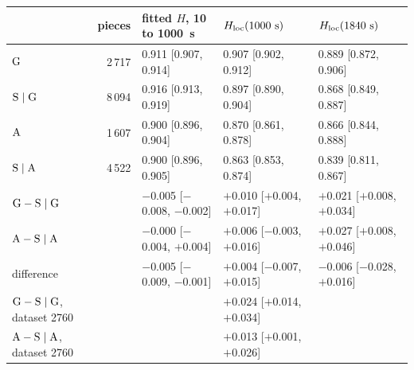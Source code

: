 \begin{tabular}{@{}l r l l l@{}}
\toprule
 & pieces & fitted $H$, 10 to 1000~s & $H_\mathrm{loc}(1000~\mathrm{s})$ & $H_\mathrm{loc}(1840~\mathrm{s})$ \\
\midrule
$\mathrm{G}$ & 2\,717 & 0.911 [0.907, 0.914] & 0.907 [0.902, 0.912] & 0.889 [0.872, 0.906] \\
$\mathrm{S}\mid\mathrm{G}$ & 8\,094 & 0.916 [0.913, 0.919] & 0.897 [0.890, 0.904] & 0.868 [0.849, 0.887] \\
\addlinespace
$\mathrm{A}$ & 1\,607 & 0.900 [0.896, 0.904] & 0.870 [0.861, 0.878] & 0.866 [0.844, 0.888] \\
$\mathrm{S}\mid\mathrm{A}$ & 4\,522 & 0.900 [0.896, 0.905] & 0.863 [0.853, 0.874] & 0.839 [0.811, 0.867] \\
\midrule
$\mathrm{G}-\mathrm{S}\mid\mathrm{G}$ & & $-$0.005 [$-$0.008, $-$0.002] & $+$0.010 [$+$0.004, $+$0.017] & $+$0.021 [$+$0.008, $+$0.034] \\
$\mathrm{A}-\mathrm{S}\mid\mathrm{A}$ & & $-$0.000 [$-$0.004, $+$0.004] & $+$0.006 [$-$0.003, $+$0.016] & $+$0.027 [$+$0.008, $+$0.046] \\
difference & & $-$0.005 [$-$0.009, $-$0.001] & $+$0.004 [$-$0.007, $+$0.015] & $-$0.006 [$-$0.028, $+$0.016] \\
\midrule
$\mathrm{G}-\mathrm{S}\mid\mathrm{G}$, dataset 2760 & & & $+$0.024 [$+$0.014, $+$0.034] & \\
$\mathrm{A}-\mathrm{S}\mid\mathrm{A}$, dataset 2760 & & & $+$0.013 [$+$0.001, $+$0.026] & \\
\bottomrule
\end{tabular}
